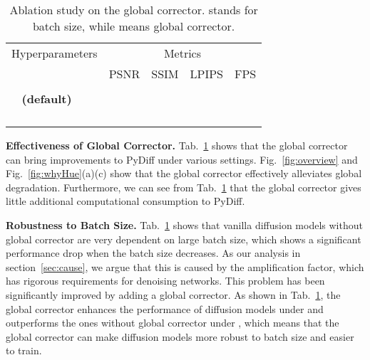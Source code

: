 \documentclass{article}
\begin{document}
\begin{table}[tb]
\small
\setlength{\tabcolsep}{2pt}
\renewcommand{\arraystretch}{0.9} \centering
\begin{tabular}{cccccc}
\toprule

 \multicolumn{2}{c}{Hyperparameters}  & \multicolumn{4}{c}{Metrics} \\

\cmidrule(lr){1-2} \cmidrule(lr){3-6}

   &  & PSNR & SSIM
& LPIPS & FPS \\

\midrule

  &   &   &  &  &   \\
 \textbf{(default)} &   &   &  &  &  \\

\midrule

 \multirow{2}{*}{} &   &   &  &  &   \\
   &   &   &  &  &  \\
    
\midrule
    
     \multirow{2}{*}{}&   &   &  &  &   \\
     &   &   &  &  &  \\

\bottomrule
\end{tabular}
\caption{Ablation study on the global corrector.  stands for batch size, while  means global corrector.}
\label{tab:gc-abl}
\end{table}

\noindent \textbf{Effectiveness of Global Corrector.} 
Tab.~\ref{tab:gc-abl} shows that the global corrector can bring improvements to PyDiff under various settings. Fig.~\ref{fig:overview} and Fig.~\ref{fig:whyHue}(a)(c) show that the global corrector effectively alleviates global degradation. Furthermore, we can see from Tab.~\ref{tab:gc-abl} that the global corrector gives little additional computational consumption to PyDiff. 

\noindent \textbf{Robustness to Batch Size.}
Tab.~\ref{tab:gc-abl} shows that vanilla diffusion models without global corrector are very dependent on large batch size, which shows a significant performance drop when the batch size decreases. As our analysis in section~\ref{sec:cause}, we argue that this is caused by the amplification factor, which has rigorous requirements for denoising networks. This problem has been significantly improved by adding a global corrector. As shown in Tab.~\ref{tab:gc-abl}, the global corrector enhances the performance of diffusion models under  and outperforms the ones without global corrector under , which means that the global corrector can make diffusion models more robust to batch size and easier to train.
\end{document}
